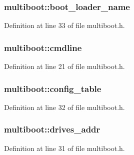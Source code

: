 \subsubsection[{\texorpdfstring{boot\+\_\+loader\+\_\+name}{boot_loader_name}}]{ multiboot\+::boot\+\_\+loader\+\_\+name}\hypertarget{structmultiboot_a7d2d768130c7214d682eb2f26c1e3b12}{}\label{structmultiboot_a7d2d768130c7214d682eb2f26c1e3b12}


Definition at line 33 of file multiboot.\+h.

\subsubsection[{\texorpdfstring{cmdline}{cmdline}}]{ multiboot\+::cmdline}\hypertarget{structmultiboot_a7849d17666a4fd87e1e778d55b5d8bbc}{}\label{structmultiboot_a7849d17666a4fd87e1e778d55b5d8bbc}


Definition at line 21 of file multiboot.\+h.

\subsubsection[{\texorpdfstring{config\+\_\+table}{config_table}}]{ multiboot\+::config\+\_\+table}\hypertarget{structmultiboot_a46395e58f775b9f026853b7ec2e26373}{}\label{structmultiboot_a46395e58f775b9f026853b7ec2e26373}


Definition at line 32 of file multiboot.\+h.

\subsubsection[{\texorpdfstring{drives\+\_\+addr}{drives_addr}}]{ multiboot\+::drives\+\_\+addr}\hypertarget{structmultiboot_a2e9f4eb0abf86b9a7a36868d1d43124d}{}\label{structmultiboot_a2e9f4eb0abf86b9a7a36868d1d43124d}


Definition at line 31 of file multiboot.\+h.

